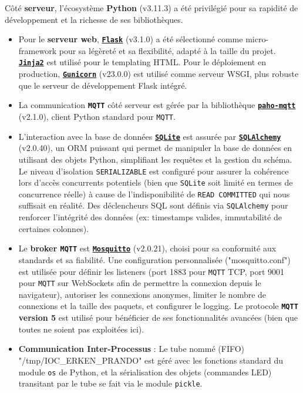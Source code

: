 \documentclass[12pt]{article}
\begin{document}
Côté \textbf{serveur}, l'écosystème \textbf{Python} (v3.11.3) a été privilégié pour sa rapidité de développement et la richesse de ses bibliothèques.
\begin{itemize}
    \item Pour le \textbf{serveur web}, \textbf{\href{https://flask.palletsprojects.com/}{\texttt{Flask}}} (v3.1.0) a été sélectionné comme micro-framework pour sa légèreté et sa flexibilité, adapté à la taille du projet. \textbf{\href{https://jinja.palletsprojects.com/}{\texttt{Jinja2}}} est utilisé pour le templating HTML. Pour le déploiement en production, \textbf{\href{https://gunicorn.org/}{\texttt{Gunicorn}}} (v23.0.0) est utilisé comme serveur WSGI, plus robuste que le serveur de développement Flask intégré.
    \item La communication \textbf{\texttt{MQTT}} côté serveur est gérée par la bibliothèque \textbf{\href{https://github.com/eclipse/paho.mqtt.python}{\texttt{paho-mqtt}}} (v2.1.0), client Python standard pour \texttt{MQTT}.
    \item L'interaction avec la base de données \textbf{\href{https://www.sqlite.org/index.html}{\texttt{SQLite}}} est assurée par \textbf{\href{https://www.sqlalchemy.org/}{\texttt{SQLAlchemy}}} (v2.0.40), un ORM puissant qui permet de manipuler la base de données en utilisant des objets Python, simplifiant les requêtes et la gestion du schéma. Le niveau d'isolation \texttt{SERIALIZABLE} est configuré pour assurer la cohérence lors d'accès concurrents potentiels (bien que \texttt{SQLite} soit limité en termes de concurrence réelle) à cause de l'indisponibilité de \texttt{READ COMMITTED} qui nous suffisait en réalité. Des déclencheurs SQL sont définis via \texttt{SQLAlchemy} pour renforcer l'intégrité des données (ex: timestamps valides, immutabilité de certaines colonnes).
    \item Le \textbf{broker \texttt{MQTT}} est \textbf{\href{https://mosquitto.org/}{\texttt{Mosquitto}}} (v2.0.21), choisi pour sa conformité aux standards et sa fiabilité. Une configuration personnalisée ("mosquitto.conf") est utilisée pour définir les listeners (port 1883 pour \texttt{MQTT} TCP, port 9001 pour \texttt{MQTT} sur WebSockets afin de permettre la connexion depuis le navigateur), autoriser les connexions anonymes, limiter le nombre de connexions et la taille des paquets, et configurer le logging. Le protocole \textbf{\texttt{MQTT} version 5} est utilisé pour bénéficier de ses fonctionnalités avancées (bien que toutes ne soient pas exploitées ici).
    \item \textbf{Communication Inter-Processus} : Le tube nommé (FIFO) "/tmp/IOC\_ERKEN\_PRANDO" est géré avec les fonctions standard du module \texttt{os} de Python, et la sérialisation des objets (commandes LED) transitant par le tube se fait via le module \texttt{pickle}.
\end{itemize}
\end{document}
